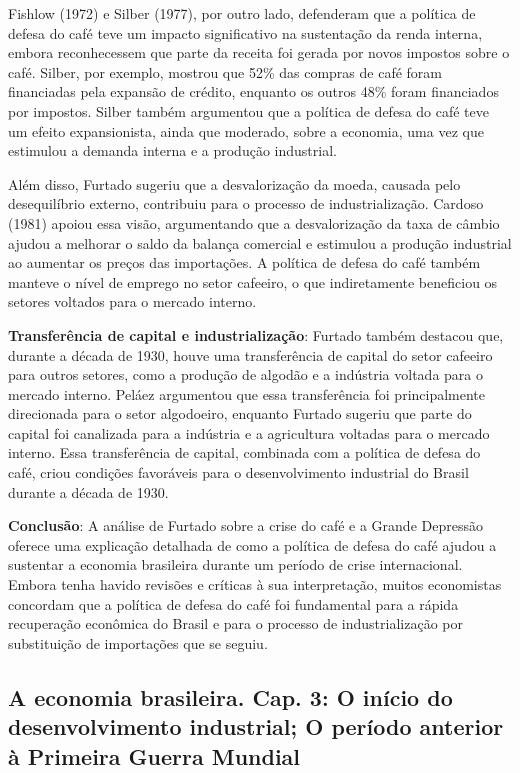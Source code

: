 \documentclass[a4paper,12pt]{article}[abntex2]
\begin{document}
Fishlow (1972) e Silber (1977), por outro lado, defenderam que a política de defesa do café teve um impacto significativo na sustentação da renda interna, embora reconhecessem que parte da receita foi gerada por novos impostos sobre o café. Silber, por exemplo, mostrou que 52\% das compras de café foram financiadas pela expansão de crédito, enquanto os outros 48\% foram financiados por impostos. Silber também argumentou que a política de defesa do café teve um efeito expansionista, ainda que moderado, sobre a economia, uma vez que estimulou a demanda interna e a produção industrial.

Além disso, Furtado sugeriu que a desvalorização da moeda, causada pelo desequilíbrio externo, contribuiu para o processo de industrialização. Cardoso (1981) apoiou essa visão, argumentando que a desvalorização da taxa de câmbio ajudou a melhorar o saldo da balança comercial e estimulou a produção industrial ao aumentar os preços das importações. A política de defesa do café também manteve o nível de emprego no setor cafeeiro, o que indiretamente beneficiou os setores voltados para o mercado interno.

\textbf{Transferência de capital e industrialização}: Furtado também destacou que, durante a década de 1930, houve uma transferência de capital do setor cafeeiro para outros setores, como a produção de algodão e a indústria voltada para o mercado interno. Peláez argumentou que essa transferência foi principalmente direcionada para o setor algodoeiro, enquanto Furtado sugeriu que parte do capital foi canalizada para a indústria e a agricultura voltadas para o mercado interno. Essa transferência de capital, combinada com a política de defesa do café, criou condições favoráveis para o desenvolvimento industrial do Brasil durante a década de 1930.

\textbf{Conclusão}: A análise de Furtado sobre a crise do café e a Grande Depressão oferece uma explicação detalhada de como a política de defesa do café ajudou a sustentar a economia brasileira durante um período de crise internacional. Embora tenha havido revisões e críticas à sua interpretação, muitos economistas concordam que a política de defesa do café foi fundamental para a rápida recuperação econômica do Brasil e para o processo de industrialização por substituição de importações que se seguiu.

\newpage
\subsection{\textbf{A economia brasileira. Cap. 3: O início do desenvolvimento industrial; O período anterior à Primeira Guerra Mundial}}
\end{document}
